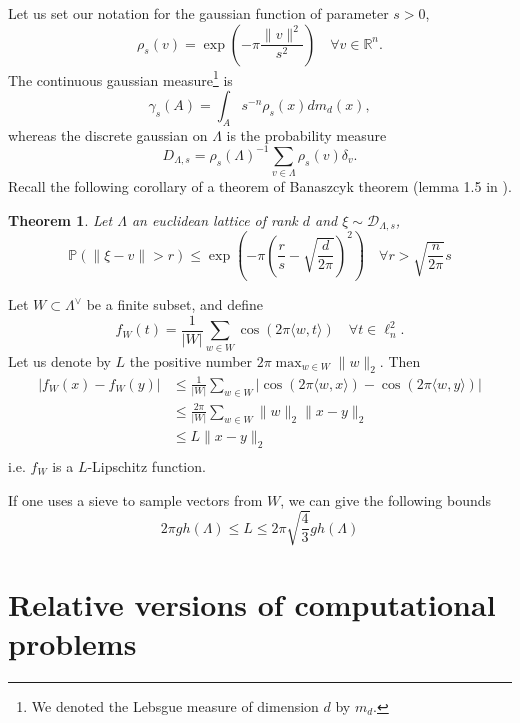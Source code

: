 \documentclass{article}
\newtheorem{theorem}{Theorem}
\begin{document}
Let us set our notation for the gaussian function of parameter $s>0$, 
$$\rho_s(v)=\exp(-\pi\frac{\|v\|^2 }{s^2} )\quad \forall v\in \mathbb R^n.$$
The continuous gaussian measure\footnote{We denoted the Lebsgue measure of dimension $d$ by $m_d$.} is 
$$\gamma_s(A) =  \int_A s^{-n}\rho_s(x)dm_d(x) ,$$
whereas the discrete gaussian on $\Lambda$ is the probability measure 
$$D_{\Lambda , s} = \rho_s(\Lambda )^{-1} \sum_{v\in \Lambda} \rho_s(v)\delta_v. $$
Recall the following corollary of a theorem of Banaszcyk theorem (lemma 1.5 in \cite{banaszczyk1993new}).

\begin{theorem}
Let $\Lambda$ an euclidean lattice of rank $d$ and $\xi \sim \mathcal D_{\Lambda , s}$,
$$\mathbb P(\|\xi - v\|> r ) \leq \exp(-\pi (\frac{r}{s} -\sqrt{\frac{d}{2\pi}})^2) \quad \forall r >\sqrt{\frac{n}{2\pi}}s $$
\end{theorem}

Let $W\subset \Lambda^\vee$ be a finite subset, and define 
$$f_W(t) = \frac{1}{|W|}\sum_{w\in W} \cos(2\pi \langle w , t \rangle) \quad \forall t \in \ell^2_n.$$
Let us denote by $L$ the positive number $2\pi\max_{w\in W} \|w\|_2$. Then
\[\begin{split}
|f_W(x) -f_W(y)| & \leq \frac{1}{|W|}\sum_{w\in W} |\cos(2\pi \langle w , x \rangle ) -\cos(2\pi \langle w , y \rangle) | \\
		 & \leq \frac{2\pi}{|W|}\sum_{w\in W} \|w\|_2 \|x-y\|_2\\
		 & \leq L\|x-y\|_2\\ 
\end{split}\]
i.e. $f_W$ is a $L$-Lipschitz function.  

If one uses a sieve to sample vectors from $W$, we can give the following bounds 
$$2\pi gh(\Lambda) \leq L \leq 2\pi\sqrt{\frac{4}{3}}gh(\Lambda) $$

\section{Relative versions of computational problems}%
\end{document}
